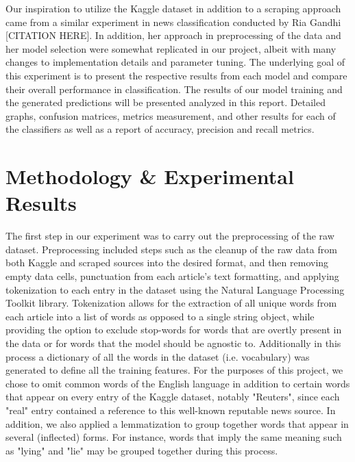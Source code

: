 \documentclass[10pt,twocolumn,letterpaper]{article}
\begin{document}
Our inspiration to utilize the Kaggle dataset in addition to a scraping approach came from a similar experiment in news classification conducted by Ria Gandhi [CITATION HERE]. In addition, her approach in preprocessing of the data and her model selection were somewhat replicated in our project, albeit with many changes to implementation details and parameter tuning. The underlying goal of this experiment is to present the respective results from each model and compare their overall performance in classification. The results of our model training and the generated predictions will be presented analyzed in this report. Detailed graphs, confusion matrices, metrics measurement, and other results  for each of the classifiers as well as a report of accuracy, precision and recall metrics. 


\section{Methodology \& Experimental Results}
\small
The first step in our experiment was to carry out the preprocessing of the raw dataset. Preprocessing included steps such as the cleanup of the raw data from both Kaggle and scraped sources into the desired format, and then removing empty data cells, punctuation from each article's text formatting, and applying tokenization to each entry in the dataset using the Natural Language Processing Toolkit library. Tokenization allows for the extraction of all unique words from each article into a list of words as opposed to a single string object, while providing the option to exclude stop-words for words that are overtly present in the data or for words that the model should be agnostic to. Additionally in this process a dictionary of all the words in the dataset (i.e. vocabulary) was generated to define all the training features. For the purposes of this project, we chose to omit common words of the English language in addition to certain words that appear on every entry of the Kaggle dataset, notably "Reuters", since each "real" entry contained a reference to this well-known reputable news source.  In addition, we also applied a lemmatization to group together words that appear in several (inflected) forms. For instance, words that imply the same meaning such as "lying" and "lie" may be grouped together during this process.\par
\end{document}
